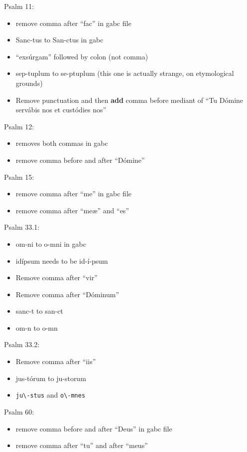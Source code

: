 \documentclass[11pt]{article}
\begin{document}
Psalm 11:
  \begin{itemize}
  \item remove comma after ``fac'' in gabc file 
  \item  Sanc-tus to San-ctus in gabc
\item ``exsúrgam'' followed by colon (not comma)
\item
sep-tuplum to se-ptuplum (this one is actually strange, on etymological grounds)
\item
Remove punctuation and then \textbf{add} comma before mediant of ``Tu Dómine servábis nos et custódies nos''
    \end{itemize}

Psalm 12:
  \begin{itemize}
  \item removes both commas in gabc
  \item  remove comma before and after ``Dómine''
    \end{itemize}

Psalm 15:
  \begin{itemize}
  \item remove comma after ``me'' in gabc file
  \item  remove comma after ``meæ'' and ``es''
    \end{itemize}

Psalm 33.1:
  \begin{itemize}
  \item om-ni to o-mni in gabc
  \item idípsum needs to be id-í-psum
    \item
  Remove comma after ``vir''
  \item
  Remove comma after ``Dóminum''
  \item
  sanc-t to san-ct
  \item
  om-n to o-mn
    \end{itemize}

Psalm 33.2:
  \begin{itemize}
    \item
  Remove comma after ``iis''
  \item
  jus-tórum to ju-storum
  \item  \verb|ju\-stus| and \verb|o\-mnes|
    \end{itemize}

Psalm 60:
  \begin{itemize}
  \item remove comma before and after ``Deus'' in gabc file
  \item  remove comma after ``tu'' and after ``meus''
    \end{itemize}
\end{document}

